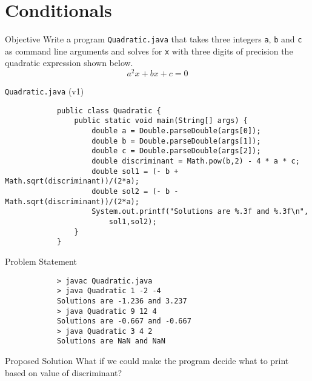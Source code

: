 \documentclass[10pt, compress]{beamer}
\begin{document}
\section{Conditionals}

\begin{slide}
	\begin{block}{Objective}
		Write a program \texttt{Quadratic.java} that takes three integers \texttt{a}, \texttt{b} and \texttt{c} as command line arguments and solves for \texttt{x} with three digits of precision the quadratic expression shown below.
		\begin{equation*}\label{eq1}
			a^2 x + b x + c = 0
		\end{equation*}
	\end{block}
\end{slide}

\begin{slide}
	\begin{block}{\texttt{Quadratic.java} (v1)}
		\begin{verbatim}
			public class Quadratic {
			    public static void main(String[] args) {
			        double a = Double.parseDouble(args[0]);
			        double b = Double.parseDouble(args[1]);
			        double c = Double.parseDouble(args[2]);
			        double discriminant = Math.pow(b,2) - 4 * a * c;
			        double sol1 = (- b + Math.sqrt(discriminant))/(2*a);
			        double sol2 = (- b - Math.sqrt(discriminant))/(2*a);
			        System.out.printf("Solutions are %.3f and %.3f\n",
			            sol1,sol2);
			    }
			}
		\end{verbatim}
	\end{block}
\end{slide}

\begin{slide}
	\begin{block}{Problem Statement}
		\begin{verbatim}
			> javac Quadratic.java
			> java Quadratic 1 -2 -4
			Solutions are -1.236 and 3.237
			> java Quadratic 9 12 4
			Solutions are -0.667 and -0.667
			> java Quadratic 3 4 2
			Solutions are NaN and NaN
		\end{verbatim}
	\end{block}
	\begin{block}{Proposed Solution}
		What if we could make the program decide what to print based on value of discriminant?
	\end{block}
\end{slide}
\end{document}
